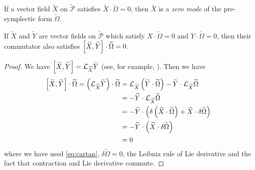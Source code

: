 \documentclass[10pt]{article}
\begin{document}
\begin{definition}
    If a vector field $\widetilde{X}$ on $\widetilde{\mathcal{P}}$ satisfies $\widetilde{X}\cdot\widetilde{\Omega}=0$, then $\widetilde{X}$ is a \textit{zero mode} of the pre-symplectic form $\widetilde{\Omega}$.
\end{definition}
\begin{claim}\label{claim:0mode}
    If $\widetilde{X}$ and $\widetilde{Y}$ are vector fields on $\widetilde{\mathcal{P}}$ which satisfy $X\cdot\widetilde{\Omega}=0$ and $Y\cdot\widetilde{\Omega}=0$, then their commutator also satisfies $\comm{\widetilde{X}}{\widetilde{Y}}\cdot\widetilde{\Omega}=0$.
\end{claim}
\begin{proof}
    We have $\comm{\widetilde{X}}{\widetilde{Y}}=\mathcal{L}_{\widetilde{X}}\widetilde{Y}$ (see, for example, \cite{Wald:1984rg}).
    Then we have 
    \begin{equation}
        \begin{split}
            \comm{\widetilde{X}}{\widetilde{Y}}\cdot\widetilde{\Omega}=\left(\mathcal{L}_{\widetilde{X}}\widetilde{Y}\right)\cdot\widetilde{\Omega}&=\mathcal{L}_{\widetilde{X}}\left(\widetilde{Y}\cdot\widetilde{\Omega}\right)-\widetilde{Y}\cdot\mathcal{L}_{\widetilde{X}}\widetilde{\Omega}\\
                                                                                                                                                   &=-\widetilde{Y}\cdot\mathcal{L}_{\widetilde{X}}\widetilde{\Omega}\\
                                                                                                                                                   &=-\widetilde{Y}\cdot\left(\delta\left(\widetilde{X}\cdot\widetilde{\Omega}\right)+\widetilde{X}\cdot\delta\widetilde{\Omega}\right)\\
                                                                                                                                                   &=-\widetilde{Y}\cdot\left(\widetilde{X}\cdot\delta\widetilde{\Omega}\right)\\
                                                                                                                                                   &=0
        \end{split}
    \end{equation}
    where we have used \cref{eq:cartan}, $\delta\widetilde{\Omega}=0$, the Leibniz rule of Lie derivative and the fact that contraction and Lie derivative commute\cite{nakahara2003geometry}.
\end{proof}
\end{document}
